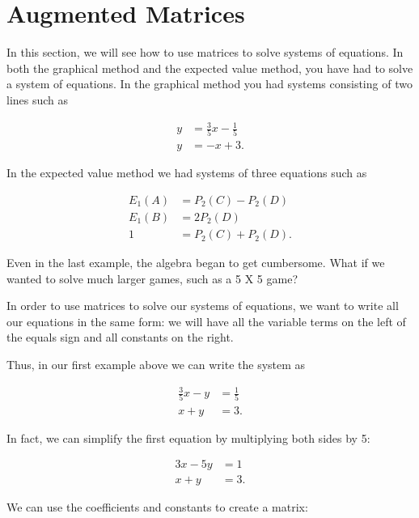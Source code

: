 
\section{Augmented Matrices}



\vspace{.1in}
In this section, we will see how to use matrices to solve systems of equations. In both the graphical method and the expected value method, you have had to solve a system of equations. In the graphical method you had systems consisting of two lines such as 

\begin{align*}
y &= \frac{3}{5}x-\frac{1}{5}\\
y &=-x+3.
\end{align*}

In the expected value method we had systems of three equations such as

\begin{align*}
E_1(A) &= P_2(C)-P_2(D)\\
E_1(B) &= 2P_2(D)\\
1 &= P_2(C)+P_2(D).
\end{align*}

Even in the last example, the algebra began to get cumbersome. What if we wanted to solve much larger games, such as a 5 X 5 game?

In order to use matrices to solve our systems of equations, we want to write all our equations in the same form: we will have all the variable terms on the left of the equals sign and all constants on the right.

Thus, in our first example above we can write the system as

\begin{align*}
\frac{3}{5}x-y &=\frac{1}{5}\\
x+y &= 3.
\end{align*}

In fact, we can simplify the first equation by multiplying both sides by 5:

\begin{align*}
3x-5y &=1\\
x+y &= 3.
\end{align*}

We can use the coefficients and constants to create a matrix:

